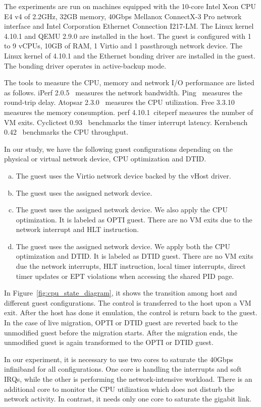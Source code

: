 
The experiments are run on machines equipped with the 10-core
Intel Xeon CPU E4 v4 of 2.2GHz, 32GB memory, 40Gbps Mellanox
ConnectX-3 Pro network interface and Intel Corporation
Ethernet Connection I217-LM. The Linux kernel 4.10.1 and QEMU
2.9.0 are installed in the host. The guest is configured with
1 to 9 vCPUs, 10GB of RAM, 1 Virtio and 1 passthrough network
device. The Linux kernel of 4.10.1 and the Ethernet bonding
driver are installed in the guest. The bonding driver operates
in active-backup mode.

The tools to measure the CPU, memory and network I/O
performance are listed as follows. iPerf 2.0.5~\cite{iperf}
measures the network bandwidth. Ping~\cite{ping} measures the
round-trip delay. Atopsar 2.3.0~\cite{atopsar} measures the
CPU utilization. Free 3.3.10~\cite{free} measures the memory
consumption. perf 4.10.1~cite{perf} measures the number of VM
exits. Cyclictest 0.93~\cite{cyclictest} benchmarks the timer
interrupt latency. Kernbench 0.42~\cite{kernbench} benchmarks
the CPU throughput.

In our study, we have the following guest configurations
depending on the physical or virtual network device, CPU
optimization and DTID.
\begin{enumerate}[(a)]
  \item The guest uses the Virtio network device backed by the
  vHost driver.
  \item The guest uses the assigned network device.
  \item The guest uses the assigned network device. We also
  apply the CPU optimization. It is labeled as OPTI guest.
  There are no VM exits due to the network interrupt and HLT
  instruction.
  \item The guest uses the assigned network device. We apply
  both the CPU optimization and DTID. It is labeled as DTID
  guest. There are no VM exits due the network interrupts, HLT
  instruction, local timer interrupts, direct timer updates or
  EPT violations when accessing the shared PID page.
  \end{enumerate}
In Figure~\ref{fig:cpu_state_diagram}, it shows the transition
among host and different guest configurations. The control is
transferred to the host upon a VM exit. After the host has
done it emulation, the control is return back to the guest. In
the case of live migration, OPTI or DTID guest are reverted
back to the unmodified guest before the migration starts.
After the migration ends, the unmodified guest is again
transformed to the OPTI or DTID guest.

In our experiment, it is necessary to use two cores to
saturate the 40Gbps infiniband for all configurations. One
core is handling the interrupts and soft IRQs, while the other
is performing the network-intensive workload. There is an
additional core to monitor the CPU utilization which does not
disturb the network activity. In contrast, it needs only one
core to saturate the gigabit link.
